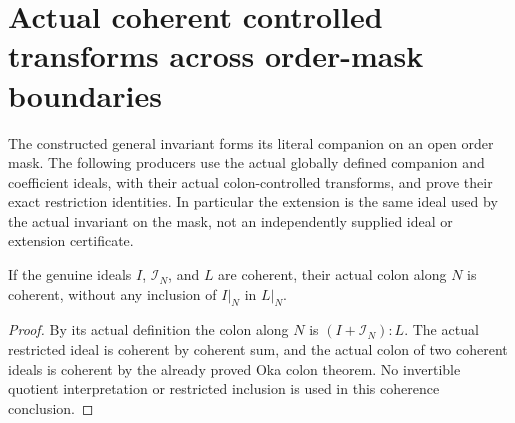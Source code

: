 \section{Actual coherent controlled transforms across order-mask boundaries}

The constructed general invariant forms its literal companion on an open
order mask. The following producers use the actual globally defined
companion and coefficient ideals, with their actual colon-controlled
transforms, and prove their exact restriction identities. In particular
the extension is the same ideal used by the actual invariant on the mask,
not an independently supplied ideal or extension certificate.

\begin{lemma}
\label{hir:coherent-transform-colon-without-inclusion}
\leanok
If the genuine ideals $I$, $\mathcal I_N$, and $L$ are coherent, their actual
colon along $N$ is coherent, without any inclusion of $I|_N$ in $L|_N$.
\end{lemma}
\begin{proof}
By its actual definition the colon along $N$ is
$(I+\mathcal I_N):L$. The actual restricted ideal is coherent by coherent
sum, and the actual colon of two coherent ideals is coherent by the already
proved Oka colon theorem. No invertible quotient interpretation or restricted
inclusion is used in this coherence conclusion.
\end{proof}

